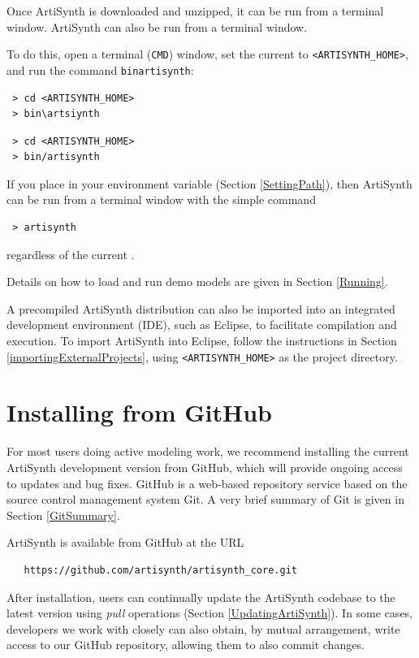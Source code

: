 \ifLinux
Once ArtiSynth is downloaded and unzipped, it can be
run from a terminal window.
\else %
ArtiSynth can also be run from a terminal window.
\fi %

To do this, open a terminal 
\ifWindows
({\tt CMD})
\fi
window, set the current \directory{} to {\tt <ARTISYNTH\_HOME>}, and
run the command {\tt bin\SEP artisynth}:
\ifWindows
\begin{verbatim}
 > cd <ARTISYNTH_HOME>
 > bin\artsiynth
\end{verbatim}
\else
\begin{verbatim}
 > cd <ARTISYNTH_HOME>
 > bin/artisynth
\end{verbatim}
\fi

\begin{sideblock}
If you place  in your \PATH{} environment
variable (Section \ref{SettingPath}), then ArtiSynth can be
run from a terminal window with the simple command
\begin{verbatim}
 > artisynth
\end{verbatim}
regardless of the current \directory{}.
\end{sideblock}

Details on how to load and run demo models are given in
Section \ref{Running}.

A precompiled ArtiSynth distribution can also be imported into an
integrated development environment (IDE), such as Eclipse, to
facilitate compilation and execution. To import ArtiSynth into
Eclipse, follow the instructions in
Section \ref{importingExternalProjects}, using {\tt <ARTISYNTH\_HOME>}
as the project directory.

\section{Installing from GitHub}
\label{GitHubInstall}

For most users doing active modeling work, we recommend installing the
current ArtiSynth development version from GitHub, which will provide
ongoing access to updates and bug fixes.  GitHub is a web-based
repository service based on the source control management system
Git. A very brief summary of Git is given in Section \ref{GitSummary}.

ArtiSynth is available from GitHub at the URL
\begin{verbatim}
   https://github.com/artisynth/artisynth_core.git
\end{verbatim}
After installation, users can continually update the ArtiSynth
codebase to the latest version using {\it pull} operations
(Section \ref{UpdatingArtiSynth}).  In some cases, developers we work
with closely can also obtain, by mutual arrangement, write access to
our GitHub repository, allowing them to also commit changes.

